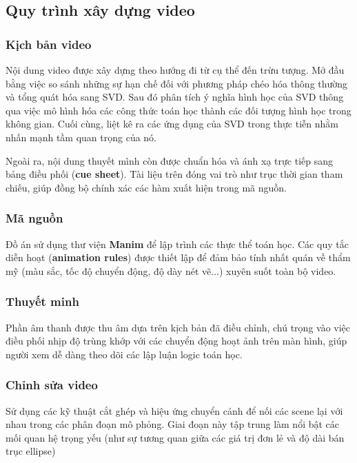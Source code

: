 \subsection{Quy trình xây dựng video}

\subsubsection{Kịch bản video}

Nội dung video được xây dựng theo hướng đi từ cụ thể đến trừu tượng. Mở đầu bằng việc so sánh những sự hạn chế đối với phương pháp chéo hóa thông thường và tổng quát hóa sang SVD. Sau đó phân tích ý nghĩa hình học của SVD thông qua việc mô hình hóa các công thức toán học thành các đối tượng hình học trong không gian. Cuối cùng, liệt kê ra các ứng dụng của SVD trong thực tiễn nhằm nhấn mạnh tầm quan trọng của nó.

Ngoài ra, nội dung thuyết mình còn được chuẩn hóa và ánh xạ trực tiếp sang bảng điều phối (\textbf{cue sheet}). Tài liệu trên đóng vai trò như trục thời gian tham chiếu, giúp đồng bộ chính xác các hàm xuất hiện trong mã nguồn.

\subsubsection{Mã nguồn}

Đồ án sử dụng thư viện \textbf{Manim} để lập trình các thực thể toán học. Các quy tắc diễn hoạt (\textbf{animation rules}) được thiết lập để đảm bảo tính nhất quán về thẩm mỹ (màu sắc, tốc độ chuyển động, độ dày nét vẽ...) xuyên suốt toàn bộ video.

\subsubsection{Thuyết minh}

Phần âm thanh được thu âm dựa trên kịch bản đã điều chỉnh, chú trọng vào việc điều phối nhịp độ trùng khớp với các chuyển động hoạt ảnh trên màn hình, giúp người xem dễ dàng theo dõi các lập luận logic toán học.

\subsubsection{Chỉnh sửa video}

Sử dụng các kỹ thuật cắt ghép và hiệu ứng chuyển cảnh để nối các scene lại với nhau trong các phân đoạn mô phỏng. Giai đoạn này tập trung làm nổi bật các mối quan hệ trọng yếu (như sự tương quan giữa các giá trị đơn lẻ và độ dài bán trục ellipse)

